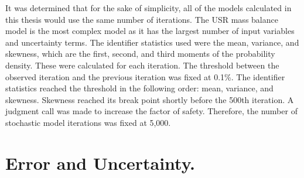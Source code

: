 \begin{linenumbers}
It was determined that for the sake of simplicity, all of the models calculated in this thesis would use the same number of iterations.  The USR mass balance model is the most complex model as it has the largest number of input variables and uncertainty terms.  The identifier statistics used were the mean, variance, and skewness, which are the first, second, and third moments of the probability density.  These were calculated for each iteration.  The threshold between the observed iteration and the previous iteration was fixed at 0.1\%.  The identifier statistics reached the threshold in the following order: mean, variance, and skewness.  Skewness reached its break point shortly before the 500th iteration.  A judgment call was made to increase the factor of safety.  Therefore, the number of stochastic model iterations was fixed at 5,000.  

\section{Error and Uncertainty.}
\label{sec:ErrorAndUncertainty}


\end{linenumbers}
